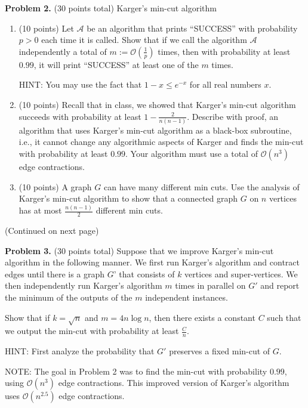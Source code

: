 \documentclass[11pt]{article}
\begin{document}
\vskip 0.2in\noindent
\textbf{Problem 2.} (30 points total)
Karger's min-cut algorithm
\begin{enumerate}
\item (10 points)
Let $\mathcal{A}$ be an algorithm that prints ``SUCCESS'' with probability $p>0$ each time it is called. 
Show that if we call the algorithm $\mathcal{A}$ independently a total of $m:=\mathcal{O}\left(\frac{1}{p}\right)$ times, then with probability at least $0.99$, it will print ``SUCCESS'' at least one of the $m$ times. 

\noindent
HINT: You may use the fact that $1-x\le e^{-x}$ for all real numbers $x$. 
\item (10 points)
Recall that in class, we showed that Karger's min-cut algorithm succeeds with probability at least $1-\frac{2}{n(n-1)}$. 
Describe with proof, an algorithm that uses Karger's min-cut algorithm as a black-box subroutine, i.e., it cannot change any algorithmic aspects of Karger and finds the min-cut with probability at least $0.99$. 
Your algorithm must use a total of $\mathcal{O}(n^3)$ edge contractions. 
\item (10 points)
A graph $G$ can have many different min cuts. 
Use the analysis of Karger's min-cut algorithm to show that a connected graph $G$ on $n$ vertices has at most $\frac{n(n-1)}{2}$ different min cuts. 
\end{enumerate}
\vskip 0.5in\noindent
\begin{center}
(Continued on next page)
\end{center}
\newpage
\noindent
\textbf{Problem 3.} (30 points total)
Suppose that we improve Karger's min-cut algorithm in the following manner. 
We first run Karger's algorithm and contract edges until there is a graph $G$' that consists of $k$ vertices and super-vertices. 
We then independently run Karger's algorithm $m$ times in parallel on $G'$ and report the minimum of the outputs of the $m$ independent instances. 

\vskip 0.1in\noindent
Show that if $k=\sqrt{n}$ and $m=4n\log n$, then there exists a constant $C$ such that we output the min-cut with probability at least $\frac{C}{n}$. 

\vskip 0.1in\noindent
HINT: First analyze the probability that $G'$ preserves a fixed min-cut of $G$. 

\vskip 0.1in\noindent
NOTE: The goal in Problem 2 was to find the min-cut with probability $0.99$, using $\mathcal{O}(n^3)$ edge contractions. 
This improved version of Karger's algorithm uses $\mathcal{O}(n^{2.5})$ edge contractions. 
\end{document}
